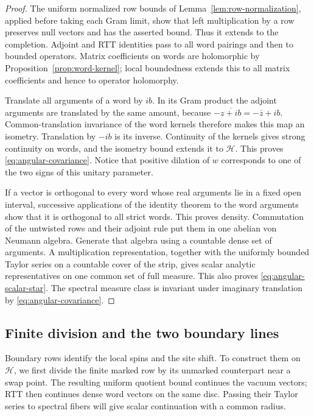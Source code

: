 \begin{proof}
The uniform normalized row bounds of Lemma~\ref{lem:row-normalization},
applied before taking each Gram limit, show that left multiplication by a
row preserves null vectors and has the asserted bound.  Thus it extends
to the completion.  Adjoint and RTT identities pass to all word pairings
and then to bounded operators.  Matrix coefficients on words are
holomorphic by Proposition~\ref{prop:word-kernel}; local boundedness
extends this to all matrix coefficients and hence to operator
holomorphy.

Translate all arguments of a word by $ib$.  In its Gram product the
adjoint arguments are translated by the same amount, because
$-\overline{z+ib}=-\overline z+ib$.  Common-translation invariance of the
word kernels therefore makes this map an isometry.  Translation by $-ib$
is its inverse.  Continuity of the kernels gives strong continuity on
words, and the isometry bound extends it to $\mathcal H$.  This proves
\eqref{eq:angular-covariance}.  Notice that positive dilation of $w$
corresponds to one of the two signs of this unitary parameter.

If a vector is orthogonal to every word whose real arguments lie in a
fixed open interval, successive applications of the identity theorem to
the word arguments show that it is orthogonal to all strict words.  This
proves density.  Commutation of the untwisted rows and their adjoint rule
put them in one abelian von Neumann algebra.  Generate that algebra using
a countable dense set of arguments.  A multiplication representation,
together with the uniformly bounded Taylor series on a countable cover
of the strip, gives scalar analytic representatives on one common set
of full measure.  This also proves
\eqref{eq:angular-scalar-star}.  The spectral measure class is invariant
under imaginary translation by \eqref{eq:angular-covariance}.
\end{proof}

\subsection{Finite division and the two boundary lines}

Boundary rows identify the local spins and the site shift. To construct
them on $\mathcal H$, we first divide the finite marked row by its
unmarked counterpart near a swap point. The resulting uniform quotient
bound continues the vacuum vectors; RTT then continues dense word
vectors on the same disc. Passing their Taylor series to spectral fibers
will give scalar continuation with a common radius.

